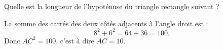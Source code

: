 \begin{example}
    Quelle est la longueur de l'hypoténuse du triangle rectangle suivant ?
    \begin{center}
        
    \end{center}
    La somme des carrés des deux côtés adjacents à l'angle droit est :
    \begin{equation}
        8^2+6^2=64+36=100.
    \end{equation}
    Donc \( AC^2=100\), c'est à dire \( AC=10\).
\end{example}
